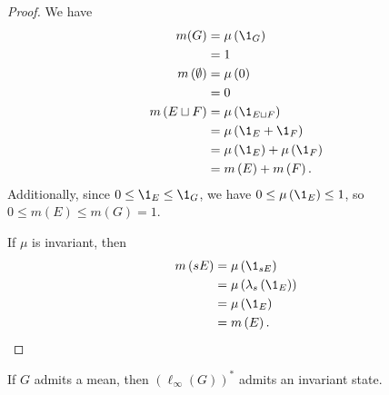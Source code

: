 \documentclass[10pt]{mypackage}
\begin{document}
\begin{proof}
  We have
  \begin{align*}
    m(G) &= \mu\left(\1_{G}\right)\\
         &= 1\\
    m\left(\emptyset\right) &= \mu\left(0\right)\\
                            &= 0\\
    m\left(E\sqcup F\right) &= \mu\left(\1_{E\sqcup F}\right)\\
                            &= \mu\left(\1_{E} + \1_{F}\right)\\
                            &= \mu\left(\1_{E}\right) + \mu\left(\1_{F}\right)\\
                            &= m\left(E\right) + m\left(F\right).
  \end{align*}
  Additionally, since $0\leq \1_{E}\leq \1_G$, we have $0\leq \mu\left(\1_{E}\right) \leq 1$, so $0 \leq m(E) \leq m(G) = 1$.\newline

  If $\mu$ is invariant, then
  \begin{align*}
    m\left(sE\right) &= \mu\left(\1_{sE}\right)\\
                     &= \mu\left(\lambda_{s}\left(\1_{E}\right)\right)\\
                     &= \mu\left(\1_{E}\right)\\
                     &= m\left(E\right).
  \end{align*}
\end{proof}
\begin{proposition}
  If $G$ admits a mean, then $\left(\ell_{\infty}\left(G\right)\right)^{\ast}$ admits an invariant state.
\end{proposition}
\end{document}
